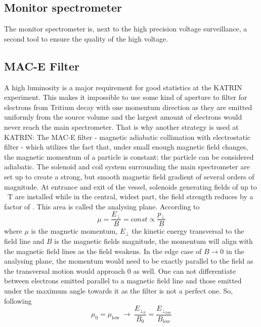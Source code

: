       \subsection{Monitor spectrometer}
      \label{ch:theKATRINexperiment:sec:experimentalSetup:subsec:monSpec}
      
      The monitor spectrometer is, next to the high precision voltage surveillance, a second tool to ensure the quality of the high voltage.

      \subsection{MAC-E Filter}
      \label{ch:The KATRIN experiment:sec:MAC-E}
      A high luminosity is a major requirement for good statistics at the KATRIN experiment. This makes it impossible to use some kind of aperture to filter for electrons from Tritium decay with one momentum direction as they are emitted uniformly from the source volume and the largest amount of electrons would never reach the main spectrometer. That is why another strategy is used at KATRIN: The MAC-E filter - magnetic adiabatic collimation with electrostatic filter - which utilizes the fact that, under small enough magnetic field changes, the magnetic momentum of a particle is constant; the particle can be considered adiabatic. The solenoid and coil system surrounding the main spectrometer are set up to create a strong, but smooth magnetic field gradient of several orders of magnitude. At entrance and exit of the vessel, solenoids generating fields of up to \SI{}{\tesla} are installed while in the central, widest part, the field strength reduces by a factor of . This area is called the analysing plane. According to
      \begin{equation}
      	\mu = \frac{E_{\bot}}{B} = const \propto \frac{p_\bot}{B}
      \end{equation}
      where $\mu$ is the magnetic momentum, $E_\bot$ the kinetic energy transversal to the field line and $B$ is the magnetic fields magnitude, the momentum will align with the magnetic field lines as the field weakens. In the edge case of $B\rightarrow 0$ in the analysing plane, the momentum would need to be exactly parallel to the field as the transversal motion would approach 0 as well. 
      One can not differentiate between electrons emitted parallel to a magnetic field line and those emitted under the maximum angle towards it as the filter is not a perfect one. So, following
      \begin{equation}
      	\mu_{\mathrm{0}} = \mu_{\mathrm{low}} ~ \longrightarrow ~ \frac{E_{\bot_0}}{B_0} = \frac{E_{\bot_{low}}}{B_{low}} 
      \end{equation}
